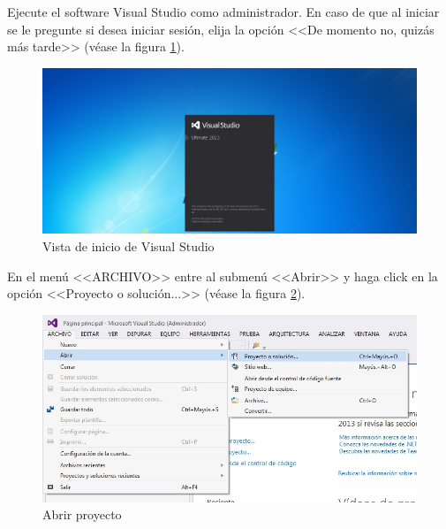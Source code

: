 	Ejecute el software Visual Studio como administrador. En caso de que al iniciar se le pregunte si desea iniciar sesi\'{o}n, elija la opci\'{o}n <<De momento no, quiz\'{a}s m\'{a}s tarde>> (v\'{e}ase la figura \ref{fig:vs-inicio}).	
\vfill
\begin{figure}[H]
  \centering
  \includegraphics[width=.8\linewidth]{./img/vs-inicio.jpg}
\caption[]{Vista de inicio de Visual Studio\label{fig:vs-inicio}}
\end{figure}
\vfill
En el men\'{u} <<ARCHIVO>> entre al submen\'{u} <<Abrir>> y haga click en la opci\'{o}n <<Proyecto o soluci\'{o}n...>> (v\'{e}ase la figura \ref{fig:vs-abrir}).	
\vfill
\begin{figure}[H]
  \centering
  \includegraphics[width=.8\linewidth]{./img/vs-proyecto-abrir.jpg}
\caption[]{Abrir proyecto\label{fig:vs-abrir}}
\end{figure}
\vfill
\newpage

